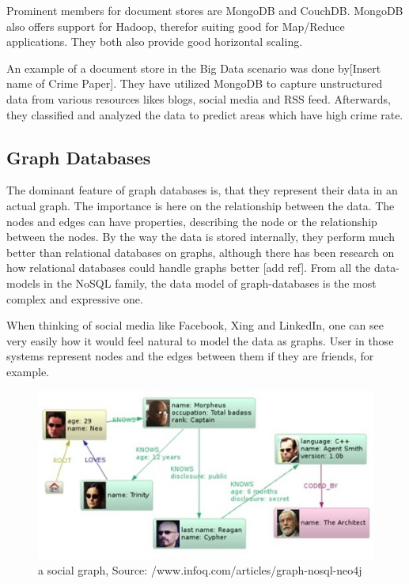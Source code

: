 \documentclass{acm_proc_article-sp}
\begin{document}
Prominent members for document stores are MongoDB and CouchDB. MongoDB also offers support for Hadoop, therefor suiting good for Map/Reduce applications. They both also provide good horizontal scaling.

An example of a document store in the Big Data scenario was done by[Insert name of Crime Paper]. They have utilized MongoDB to capture unstructured data from various resources likes blogs, social media and RSS feed. Afterwards, they classified and analyzed the data to predict areas which have high crime rate.

\subsection{Graph Databases}

The dominant feature of graph databases is, that they represent their data in an actual graph. The importance is here on the relationship between the data. The nodes and edges can have properties, describing the node or the relationship between the nodes. By the way the data is stored internally, they perform much better than relational databases on graphs, although there has been research on how relational databases could handle graphs better [add ref]. From all the data-models in the NoSQL family, the data model of graph-databases is the most complex and expressive one.

When thinking of social media like Facebook, Xing and LinkedIn, one can see very easily how it would feel natural to model the data as graphs. User in those systems represent nodes and the edges between them if they are friends, for example.

\begin{figure}[hbtp]
	\centering
	\includegraphics[scale=0.5]{neo4j.jpg}
	\caption{a social graph, Source: /www.infoq.com/articles/graph-nosql-neo4j}
\end{figure}
\end{document}
